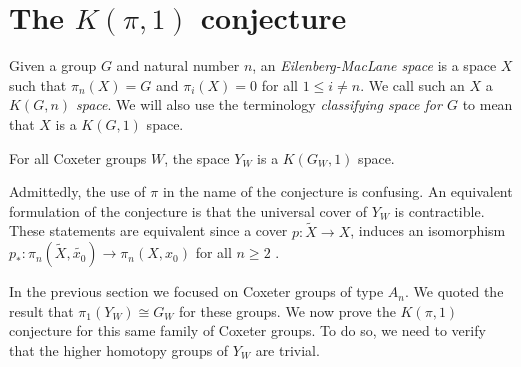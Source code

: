 \documentclass[class=article, crop=false]{standalone}
\begin{document}
	
\section{The \texorpdfstring{$K(\pi,1)$}{K pi 1} conjecture}
Given a group $G$ and natural number $n$, an \emph{Eilenberg-MacLane space} \cite{eilenberg_maclane_relations_1945} is a space $X$ such that $\pi_n(X)=G$ and $\pi_i(X) = 0$ for all $1\leq i \neq n$. We call such an $X$ a \emph{$K(G,n)$ space}. We will also use the terminology \emph{classifying space for $G$} to mean that $X$ is a $K(G,1)$ space.
\begin{conjecture}[$K(\pi,1)$ Conjecture]
	For all Coxeter groups $W$, the space $Y_W$ is a $K(G_W,1)$ space.
\end{conjecture}

Admittedly, the use of $\pi$ in the name of the conjecture is confusing. An equivalent formulation of the conjecture is that the universal cover of $Y_W$ is contractible. These statements are equivalent since a cover $p \colon \widetilde{X} \to X$, induces an isomorphism  $p_* \colon \pi_n(\widetilde{X},\widetilde{x_0}) \to \pi_n(X,x_0)$ for all $n\geq 2$ \cite[Proposition 4.1]{hatcher_algebraic_2001}.

In the previous section we focused on Coxeter groups of type $A_n$. We quoted the result that $\pi_1(Y_W) \cong G_W$ for these groups. We now prove the $K(\pi,1)$ conjecture for this same family of Coxeter groups. To do so, we need to verify that the higher homotopy groups of $Y_W$ are trivial.
\end{document}
